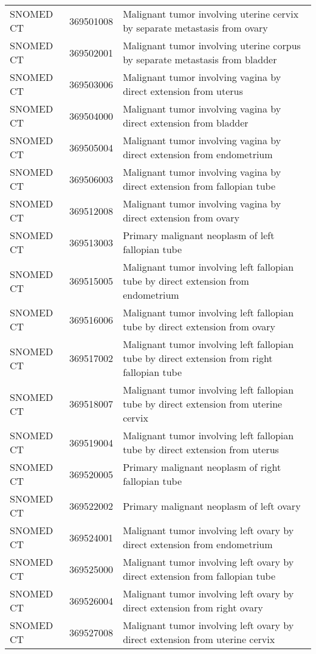 \begin{longtable}{p{}p{}p{}}
  SNOMED CT & 369501008 & Malignant tumor involving uterine cervix by separate metastasis from ovary \\ 
  SNOMED CT & 369502001 & Malignant tumor involving uterine corpus by separate metastasis from bladder \\ 
  SNOMED CT & 369503006 & Malignant tumor involving vagina by direct extension from uterus \\ 
  SNOMED CT & 369504000 & Malignant tumor involving vagina by direct extension from bladder \\ 
  SNOMED CT & 369505004 & Malignant tumor involving vagina by direct extension from endometrium \\ 
  SNOMED CT & 369506003 & Malignant tumor involving vagina by direct extension from fallopian tube \\ 
  SNOMED CT & 369512008 & Malignant tumor involving vagina by direct extension from ovary \\ 
  SNOMED CT & 369513003 & Primary malignant neoplasm of left fallopian tube \\ 
  SNOMED CT & 369515005 & Malignant tumor involving left fallopian tube by direct extension from endometrium \\ 
  SNOMED CT & 369516006 & Malignant tumor involving left fallopian tube by direct extension from ovary \\ 
  SNOMED CT & 369517002 & Malignant tumor involving left fallopian tube by direct extension from right fallopian tube \\ 
  SNOMED CT & 369518007 & Malignant tumor involving left fallopian tube by direct extension from uterine cervix \\ 
  SNOMED CT & 369519004 & Malignant tumor involving left fallopian tube by direct extension from uterus \\ 
  SNOMED CT & 369520005 & Primary malignant neoplasm of right fallopian tube \\ 
  SNOMED CT & 369522002 & Primary malignant neoplasm of left ovary \\ 
  SNOMED CT & 369524001 & Malignant tumor involving left ovary by direct extension from endometrium \\ 
  SNOMED CT & 369525000 & Malignant tumor involving left ovary by direct extension from fallopian tube \\ 
  SNOMED CT & 369526004 & Malignant tumor involving left ovary by direct extension from right ovary \\ 
  SNOMED CT & 369527008 & Malignant tumor involving left ovary by direct extension from uterine cervix \\ 

\end{longtable}
